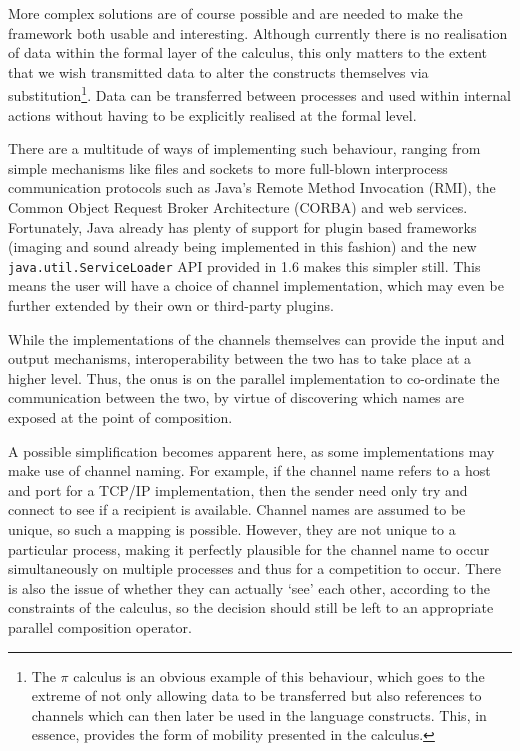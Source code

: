 \documentclass{acm_proc_article-sp}
\begin{document}
More complex solutions are of course possible and are needed to make the
framework both usable and interesting.  Although currently there is no
realisation of data within the formal layer of the calculus, this only
matters to the extent that we wish transmitted data to alter the
constructs themselves via substitution\footnote{The $\pi$ calculus
\cite{picalctutorial} is an obvious example of this
behaviour, which goes to the extreme of not only allowing data to be
transferred but also references to channels which can then later be used
in the language constructs.  This, in essence, provides the form of
mobility presented in the calculus.}.  Data can be transferred between
processes and used within internal actions without having to be
explicitly realised at the formal level.

There are a multitude of ways of implementing such behaviour, ranging
from simple mechanisms like files and sockets to more full-blown
interprocess communication protocols such as Java's Remote Method
Invocation (RMI), the Common Object Request Broker Architecture (CORBA)
and web services.  Fortunately, Java already has plenty of support for
plugin based frameworks (imaging and sound already being implemented in
this fashion) and the new \texttt{java.util.ServiceLoader} API provided
in 1.6 makes this simpler still.  This means the user will have a choice
of channel implementation, which may even be further extended by their
own or third-party plugins.

While the implementations of the channels themselves can provide the
input and output mechanisms, interoperability between the two has to
take place at a higher level.  Thus, the onus is on the parallel
implementation to co-ordinate the communication between the two, by
virtue of discovering which names are exposed at the point of
composition.  

A possible simplification becomes apparent here, as some implementations
may make use of channel naming.  For example, if the channel name refers
to a host and port for a TCP/IP implementation, then the sender need
only try and connect to see if a recipient is available.  Channel names
are assumed to be unique, so such a mapping is possible.  However, they
are not unique to a particular process, making it perfectly plausible
for the channel name to occur simultaneously on multiple processes and
thus for a competition to occur.  There is also the issue of whether
they can actually `see' each other, according to the constraints of the
calculus, so the decision should still be left to an appropriate
parallel composition operator.
\end{document}
